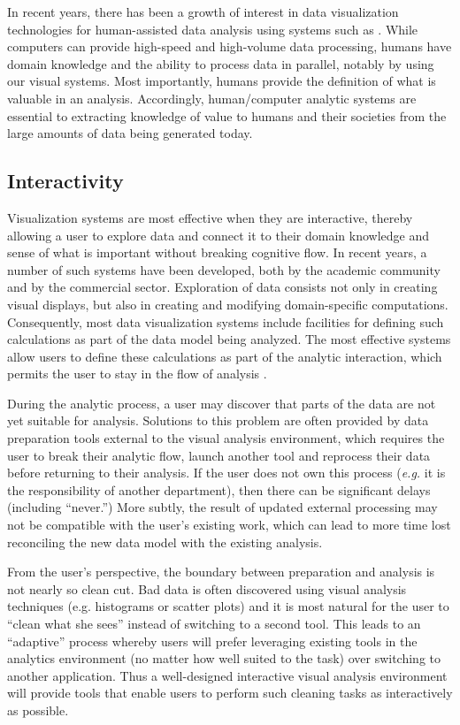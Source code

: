 In recent years, there has been a growth of interest in data visualization technologies for human-assisted data analysis using systems such as \cite{Polaris,Qlik,Spotfire}. While computers can provide high-speed and high-volume data processing, humans have domain knowledge and the ability to process data in parallel, notably by using our visual systems. Most importantly, humans provide the definition of what is valuable in an analysis. Accordingly, human/computer analytic systems are essential to extracting knowledge of value to humans and their societies from the large amounts of data being generated today.

\subsection{Interactivity}
Visualization systems are most effective when they are interactive, thereby allowing a user to explore data and connect it to their domain knowledge and sense of what is important without breaking cognitive flow. In recent years, a number of such systems have been developed, both by the academic community and by the commercial sector. Exploration of data consists not only in creating visual displays, but also in creating and modifying domain-specific computations. Consequently, most data visualization systems include facilities for defining such calculations as part of the data model being analyzed. The most effective systems allow users to define these calculations as part of the analytic interaction, which permits the user to stay in the flow of analysis \cite{Morton:2012}.

During the analytic process, a user may discover that parts of the data are not yet suitable for analysis. Solutions to this problem are often provided by data preparation tools external to the visual analysis environment, which requires the user to break their analytic flow, launch another tool and reprocess their data before returning to their analysis. If the user does not own this process (\textit{e.g.} it is the responsibility of another department), then there can be significant delays (including ``never.'') More subtly, the result of updated external processing may not be compatible with the user's existing work, which can lead to more time lost reconciling the new data model with the existing analysis.

From the user's perspective, the boundary between preparation and analysis is not nearly so clean cut. Bad data is often discovered using visual analysis techniques (e.g. histograms or scatter plots) and it is most natural for the user to ``clean what she sees'' instead of switching to a second tool. This leads to an ``adaptive'' process whereby users will prefer leveraging existing tools in the analytics environment (no matter how well suited to the task) over switching to another application. Thus a well-designed interactive visual analysis environment will provide tools that enable users to perform such cleaning tasks as interactively as possible.


